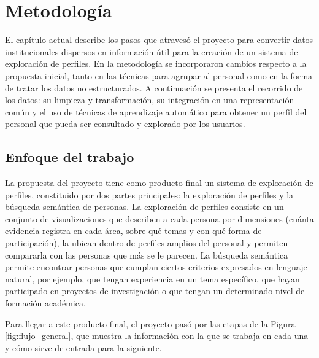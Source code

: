 \chapter{Metodología}
\label{chapter:metodologia}

El capítulo actual describe los pasos que atravesó el proyecto para convertir datos institucionales dispersos en información útil para la creación de un sistema de exploración de perfiles. En la metodología se incorporaron cambios respecto a la propuesta inicial, tanto en las técnicas para agrupar al personal como en la forma de tratar los datos no estructurados. A continuación se presenta el recorrido de los datos: su limpieza y transformación, su integración en una representación común y el uso de técnicas de aprendizaje automático para obtener un perfil del personal que pueda ser consultado y explorado por los usuarios.

\section{Enfoque del trabajo}
\label{sec:met_enfoque}

La propuesta del proyecto tiene como producto final un sistema de exploración de perfiles, constituido por dos partes principales: la exploración de perfiles y la búsqueda semántica de personas. La exploración de perfiles consiste en un conjunto de visualizaciones que describen a cada persona por dimensiones (cuánta evidencia registra en cada área, sobre qué temas y con qué forma de participación), la ubican dentro de perfiles amplios del personal y permiten compararla con las personas que más se le parecen. La búsqueda semántica permite encontrar personas que cumplan ciertos criterios expresados en lenguaje natural, por ejemplo, que tengan experiencia en un tema específico, que hayan participado en proyectos de investigación o que tengan un determinado nivel de formación académica.

Para llegar a este producto final, el proyecto pasó por las etapas de la Figura \ref{fig:flujo_general}, que muestra la información con la que se trabaja en cada una y cómo sirve de entrada para la siguiente.

